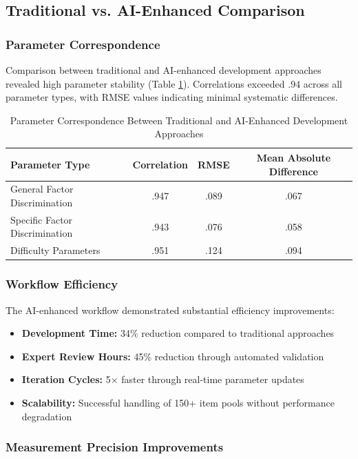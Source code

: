 \documentclass[12pt,a4paper]{article}
\begin{document}
\subsection{Traditional vs. AI-Enhanced Comparison}

\subsubsection{Parameter Correspondence}

Comparison between traditional and AI-enhanced development approaches revealed high parameter stability (Table \ref{tab:param-comparison}). Correlations exceeded .94 across all parameter types, with RMSE values indicating minimal systematic differences.

\begin{table}[ht]
\centering
\caption{Parameter Correspondence Between Traditional and AI-Enhanced Development Approaches}
\label{tab:param-comparison}
\begin{tabular}{lccc}
\toprule
Parameter Type & Correlation & RMSE & Mean Absolute Difference \\
\midrule
General Factor Discrimination & .947 & .089 & .067 \\
Specific Factor Discrimination & .943 & .076 & .058 \\
Difficulty Parameters & .951 & .124 & .094 \\
\bottomrule
\end{tabular}
\end{table}

\subsubsection{Workflow Efficiency}

The AI-enhanced workflow demonstrated substantial efficiency improvements:
\begin{itemize}
\item \textbf{Development Time:} 34\% reduction compared to traditional approaches
\item \textbf{Expert Review Hours:} 45\% reduction through automated validation
\item \textbf{Iteration Cycles:} 5× faster through real-time parameter updates
\item \textbf{Scalability:} Successful handling of 150+ item pools without performance degradation
\end{itemize}

\subsubsection{Measurement Precision Improvements}
\end{document}
